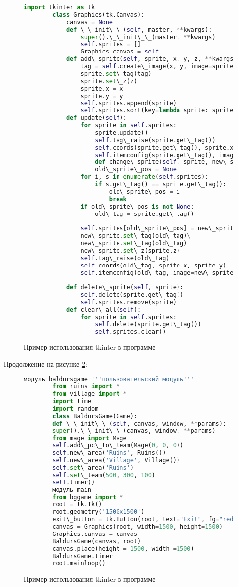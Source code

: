 \begin{figure}[H]
	\begin{lstlisting}[language=Python]
		import tkinter as tk
		class Graphics(tk.Canvas):
			canvas = None
			def \_\_init\_\_(self, master, **kwargs):
				super().\_\_init\_\_(master, **kwargs)
				self.sprites = []
				Graphics.canvas = self			
			def add\_sprite(self, sprite, x, y, z, **kwargs):
				tag = self.create\_image(x, y, image=sprite.image, anchor='center', **kwargs)
				sprite.set\_tag(tag)
				sprite.set\_z(z)
				sprite.x = x
				sprite.y = y
				self.sprites.append(sprite)
				self.sprites.sort(key=lambda sprite: sprite.z)
			def update(self):
				for sprite in self.sprites:
					sprite.update()
					self.tag\_raise(sprite.get\_tag())
					self.coords(sprite.get\_tag(), sprite.x, sprite.y)
					self.itemconfig(sprite.get\_tag(), image=sprite.image)
					def change\_sprite(self, sprite, new\_sprite):
					old\_sprite\_pos = None
				for i, s in enumerate(self.sprites):
					if s.get\_tag() == sprite.get\_tag():
						old\_sprite\_pos = i
						break
				if old\_sprite\_pos is not None:
					old\_tag = sprite.get\_tag()
			
				self.sprites[old\_sprite\_pos] = new\_sprite
				new\_sprite.set\_tag(old\_tag)\
				new\_sprite.set\_tag(old\_tag)
				new\_sprite.set\_z(sprite.z)
				self.tag\_raise(old\_tag)
				self.coords(old\_tag, sprite.x, sprite.y)
				self.itemconfig(old\_tag, image=new\_sprite.image)
			
			def delete\_sprite(self, sprite):
				self.delete(sprite.get\_tag()
				self.sprites.remove(sprite)
			def clear\_all(self):	
				for sprite in self.sprites:
					self.delete(sprite.get\_tag())
					self.sprites.clear()
	\end{lstlisting}  
	\caption{Пример использования tkinter в программе}
	\label{tkinter2:image}
\end{figure}


Продолжение на рисунке \ref{tkinter3:image}:
\begin{figure}[H]
	\begin{lstlisting}[language=Python]
		модуль baldursgame '''пользовательский модуль'''
		from ruins import *
		from village import *
		import time
		import random
		class BaldursGame(Game):
		def \_\_init\_\_(self, canvas, window, **params):
		super().\_\_init\_\_(canvas, window, **params)
		from mage import Mage
		self.add\_pc\_to\_team(Mage(0, 0, 0))
		self.new\_area('Ruins', Ruins())
		self.new\_area('Village', Village())
		self.set\_area('Ruins')
		self.set\_team(500, 300, 100)
		self.timer()
		модуль main
		from bggame import *
		root = tk.Tk()
		root.geometry('1500x1500')
		exit\_button = tk.Button(root, text="Exit", fg="red", command=root.destroy)
		canvas = Graphics(root, width=1500, height=1500)
		Graphics.canvas = canvas
		BaldursGame(canvas, root)
		canvas.place(height = 1500, width =1500)
		BaldursGame.timer
		root.mainloop()
	\end{lstlisting}  
	\caption{Пример использования tkinter в программе}
	\label{tkinter3:image}
\end{figure}
	
